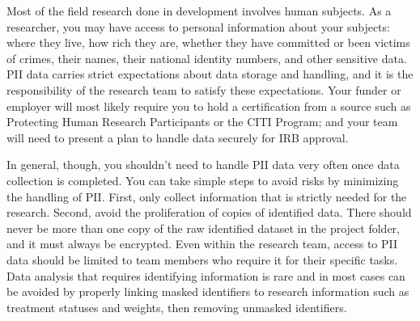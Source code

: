 Most of the field research done in development involves human subjects.
As a researcher, you may have access to personal information about your subjects:
where they live, how rich they are, whether they have committed or been victims of crimes,
their names, their national identity numbers, and other sensitive data.
PII data carries strict expectations about data storage and handling,
and it is the responsibility of the research team to satisfy these expectations.
Your funder or employer will most likely require you to hold a certification from a source
such as Protecting Human Research Participants
or the CITI Program;
and your team will need to present a plan to handle data securely for IRB approval.

In general, though, you shouldn't need to handle PII data very often
once data collection is completed.
You can take simple steps to avoid risks by minimizing the handling of PII.
First, only collect information that is strictly needed for the research.
Second, avoid the proliferation of copies of identified data.
There should never be more than one copy of the raw identified dataset in the project folder,
and it must always be encrypted.
Even within the research team,
access to PII data should be limited to team members who require it for their specific tasks.
Data analysis that requires identifying information is rare
and in most cases can be avoided by properly linking masked identifiers to research information
such as treatment statuses and weights, then removing unmasked identifiers.

